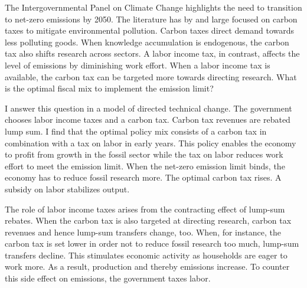 The Intergovernmental Panel on Climate Change highlights the need to transition to net-zero emissions by 2050. The literature has by and large focused on carbon taxes to mitigate environmental pollution. Carbon taxes direct demand towards less polluting goods. When knowledge accumulation is endogenous, the carbon tax also shifts research across sectors. A labor income tax, in contrast, affects the level of emissions by diminishing work effort. When a labor income tax is available, the carbon tax can be targeted more towards directing research. 
What is the optimal fiscal mix to implement the emission limit?

I answer this question in a model of directed technical change. The government chooses labor income taxes and a carbon tax. Carbon tax revenues are rebated lump sum. I find that the optimal policy mix consists of a carbon tax in combination with a tax on labor in early years. This policy enables the economy to profit from growth in the fossil sector while the tax on labor reduces work effort to meet the emission limit. When the net-zero emission limit binds, the economy has to reduce fossil research more. The optimal carbon tax rises. A subsidy on labor stabilizes output. 

The role of labor income taxes arises from the contracting effect of lump-sum rebates. 
When the carbon tax is also targeted at directing research, carbon tax revenues and hence lump-sum transfers change, too. When, for instance, the carbon tax is set lower in order not to reduce fossil research too much, lump-sum transfers decline. This stimulates economic activity as households are eager to work more. As a result, production and thereby emissions increase. To counter this side effect on emissions, the government taxes labor. 




